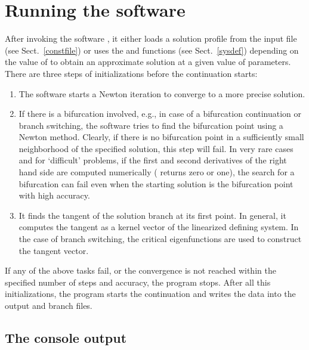 \documentclass[10pt,a4paper]{ddedoc}
\begin{document}
\section{Running the software}

After invoking the software , it either loads a solution profile from the input file (see Sect.\ \ref{constfile}) or uses the 
 and  functions (see Sect.\ \ref{sysdef}) depending on the value of  to obtain an approximate solution at a given value of parameters. There are three steps of initializations before the continuation starts:
\begin{enumerate}
\item The software starts a Newton iteration to converge to a more precise solution.
\item If there is a bifurcation involved, e.g., in case of a bifurcation continuation or branch switching, the software tries to find the bifurcation point using a Newton method. Clearly, if there is no bifurcation point in a sufficiently small neighborhood of the specified solution, this step will fail. In very rare cases and for `difficult' problems, if the first and second derivatives of the right hand side are computed numerically ( returns zero or one), the search for a bifurcation can fail even when the starting solution is the bifurcation point with high accuracy.
\item It finds the tangent of the solution branch at its first point. In general, it computes the tangent as a kernel vector of the linearized defining system. In the case of branch switching, the critical eigenfunctions are used to construct the tangent vector.
\end{enumerate}
If any of the above tasks fail, or the convergence is not reached within the specified number of steps and accuracy, the program stops.
After all this initializations, the program starts the continuation and writes the data into the output and branch files.

\subsection{The console output}
\end{document}
